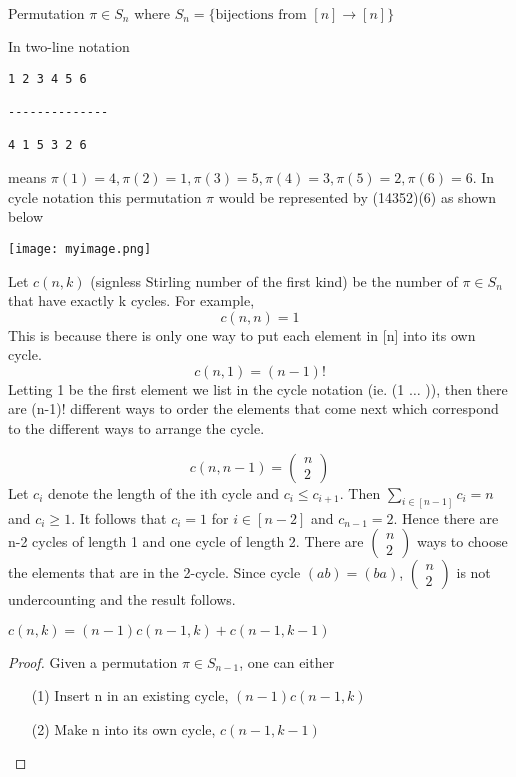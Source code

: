 \documentclass{article}
\begin{document}
\begin{enumerate}
\begin{center} \end{center}
\\

Permutation $\pi \in S_n$ where $S_n = \{\mbox{bijections from }[n] \to [n] \}$

In two-line notation \\
\begin{center}
\begin{verbatim}
1 2 3 4 5 6

--------------

4 1 5 3 2 6
\end{verbatim}
\end{center}
means $\pi(1)=4,\pi(2) = 1,\pi(3)=5,\pi(4)=3,\pi(5)=2,\pi(6)=6$. In cycle notation this permutation $\pi$ would be represented by (14352)(6) as shown below
\begin{center}
\texttt{[image: myimage.png]}
\end{center}

Let $c(n,k)$ (signless Stirling number of the first kind) be the number of $\pi \in S_n$ that have exactly k cycles. For example, 
$$c(n,n) =1$$ 
This is because there is only one way to put each element in [n] into its own cycle.
$$c(n,1) = (n-1)!$$
Letting 1 be the first element we list in the cycle notation (ie. (1 $\dots$ )), then there are (n-1)! different ways to order the elements that come next which correspond to the different ways to arrange the cycle. 

$$ c(n,n-1) = \begin{pmatrix} n \\ 2 \end{pmatrix}$$
Let $c_i$ denote the length of the ith cycle and $c_i \leq c_{i+1}$. Then $\sum_{i \in [n-1]}c_i = n$ and $c_i \geq 1$. It follows that $c_i = 1$ for $i \in [n-2]$ and $c_{n-1} = 2$. Hence there are n-2 cycles of length 1 and one cycle of length 2. There are $\begin{pmatrix} n \\ 2 \end{pmatrix}$ ways to choose the elements that are in the 2-cycle. Since cycle $(ab)= (ba)$, $\begin{pmatrix} n \\ 2 \end{pmatrix}$ is not undercounting and the result follows.

\begin{lem} $c(n,k) = (n-1)c(n-1,k)+c(n-1,k-1)$ \end{lem}
\begin{proof}
Given a permutation $\pi \in S_{n-1}$, one can either
\begin{enumerate}
\item[(1)] Insert n in an existing cycle, $(n-1)c(n-1,k)$
\item[(2)] Make n into its own cycle, $c(n-1,k-1)$
\end{enumerate}
\end{proof}


\end{enumerate}
\end{document}

